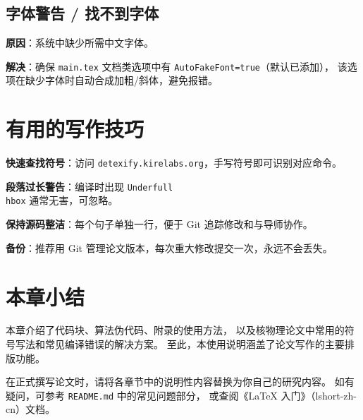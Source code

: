\subsection{字体警告 / 找不到字体}

\textbf{原因}：系统中缺少所需中文字体。

\textbf{解决}：确保 \texttt{main.tex} 文档类选项中有 \texttt{AutoFakeFont=true}（默认已添加），
该选项在缺少字体时自动合成加粗/斜体，避免报错。

\section{有用的写作技巧}

\begin{compactitem}
    \item \textbf{快速查找符号}：访问 \texttt{detexify.kirelabs.org}，手写符号即可识别对应命令。
    \item \textbf{段落过长警告}：编译时出现 \texttt{Underfull \\hbox} 通常无害，可忽略。
    \item \textbf{保持源码整洁}：每个句子单独一行，便于 Git 追踪修改和与导师协作。
    \item \textbf{备份}：推荐用 Git 管理论文版本，每次重大修改提交一次，永远不会丢失。
\end{compactitem}

\section{本章小结}

本章介绍了代码块、算法伪代码、附录的使用方法，
以及核物理论文中常用的符号写法和常见编译错误的解决方案。
至此，本使用说明涵盖了论文写作的主要排版功能。

在正式撰写论文时，请将各章节中的说明性内容替换为你自己的研究内容。
如有疑问，可参考 \texttt{README.md} 中的常见问题部分，
或查阅《\LaTeX{} 入门》（lshort-zh-cn）文档。
